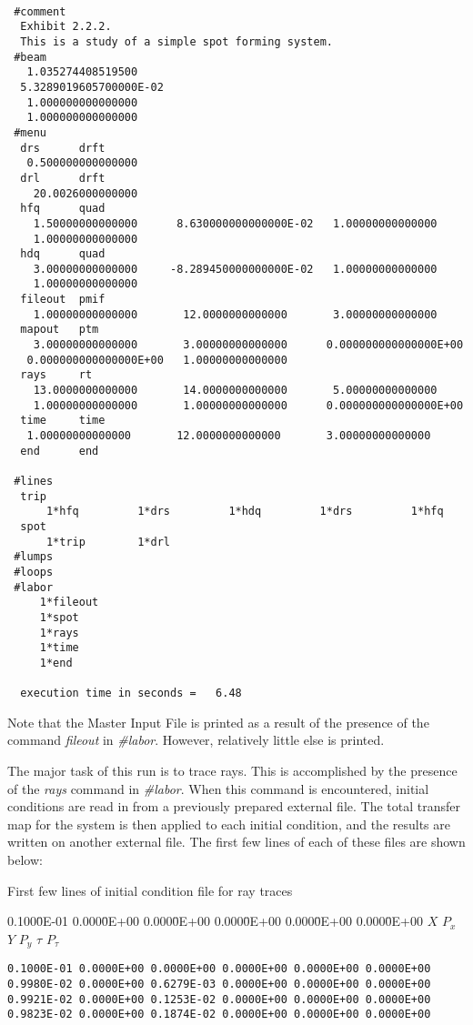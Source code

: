 {
\footnotesize\tt
\begin{verbatim}
 #comment
  Exhibit 2.2.2.
  This is a study of a simple spot forming system.
 #beam
   1.035274408519500
  5.3289019605700000E-02
   1.000000000000000
   1.000000000000000
 #menu
  drs      drft
   0.500000000000000
  drl      drft
    20.0026000000000
  hfq      quad
    1.50000000000000      8.630000000000000E-02   1.00000000000000
    1.00000000000000
  hdq      quad
    3.00000000000000     -8.289450000000000E-02   1.00000000000000
    1.00000000000000
  fileout  pmif
    1.00000000000000       12.0000000000000       3.00000000000000
  mapout   ptm
    3.00000000000000       3.00000000000000      0.000000000000000E+00
   0.000000000000000E+00   1.00000000000000
  rays     rt
    13.0000000000000       14.0000000000000       5.00000000000000
    1.00000000000000       1.00000000000000      0.000000000000000E+00
  time     time
   1.00000000000000       12.0000000000000       3.00000000000000
  end      end

 #lines
  trip
      1*hfq         1*drs         1*hdq         1*drs         1*hfq
  spot
      1*trip        1*drl
 #lumps
 #loops
 #labor
     1*fileout
     1*spot
     1*rays
     1*time
     1*end

  execution time in seconds =   6.48
\end{verbatim}}
\noindent Note that the Master Input File is printed as a result of the presence of
the command {\em fileout } in {\em \#labor}.  However, relatively little else is printed.

    The major task of this run is to trace rays.  This is accomplished by
the presence of the {\em rays } command in {\em \#labor}.  When this command is
encountered, initial conditions are read in from a previously prepared
external file.  The total transfer map for the system is then applied to
each initial condition, and the results are written on another external
file.  The first few lines of each of these files are shown below:
\vspace{5mm}
\pagebreak

First few lines of initial condition file for ray traces
\begin{footnotesize}
\begin{tt}
\begin{tabbing}
0.100\=0E-01 0.000\=0E+00 0.000\=0E+00 0.000\=0E+00 0.000\=0E+00 0.000\=0E+00 \kill
\>$X$ \>$P_x$ \>$Y$ \>$P_y$ \>$\tau$ \>$P_{\tau}$
\end{tabbing}
\end{tt}
\vspace{-5mm}
\begin{verbatim}
0.1000E-01 0.0000E+00 0.0000E+00 0.0000E+00 0.0000E+00 0.0000E+00
0.9980E-02 0.0000E+00 0.6279E-03 0.0000E+00 0.0000E+00 0.0000E+00
0.9921E-02 0.0000E+00 0.1253E-02 0.0000E+00 0.0000E+00 0.0000E+00
0.9823E-02 0.0000E+00 0.1874E-02 0.0000E+00 0.0000E+00 0.0000E+00
\end{verbatim}
\end{footnotesize}
\vspace{5mm}

